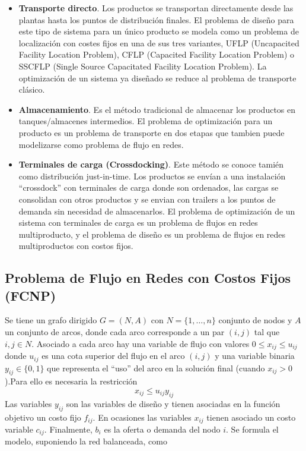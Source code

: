 \begin{itemize}
    \item \textbf{Transporte directo}. Los productos se transportan directamente desde las plantas hasta los puntos de
    distribución finales. El problema de diseño para este tipo de sistema para un único producto se modela como un problema
    de localización con costes fijos en una de sus tres variantes, UFLP (Uncapacited Facility Location Problem), CFLP
    (Capacited Facility Location Problem) o SSCFLP (Single Source Capacitated Facility Location Problem). La optimización de
    un sistema ya diseñado se reduce al problema de transporte clásico.
    \item \textbf{Almacenamiento}. Es el método tradicional de almacenar los productos en tanques/almacenes intermedios. El problema de
    optimización para un producto es un problema de transporte en dos etapas que tambien puede modelizarse como problema de
    flujo en redes.
    \item \textbf{Terminales de carga (Crossdocking)}. Este método se conoce tamién como distribución just-in-time. Los
    productos se envían a una instalación ``crossdock'' con terminales de carga donde son ordenados, las cargas se consolidan
    con otros productos y se envian con trailers a los puntos de demanda sin necesidad de almacenarlos. El problema de
    optimización de un sistema con terminales de carga es un problema de flujos en redes multiproducto, y el problema de diseño
    es un problema de flujos en redes multiproductos con costos fijos.
\end{itemize}

\subsection{Problema de Flujo en Redes con Costos Fijos (FCNP)}

Se tiene un grafo dirigido $G=(N,A)$ con $N=\{1,\dots,n\}$ conjunto de nodos y $A$ un conjunto de arcos, donde cada arco
corresponde a un par $(i,j)$ tal que $i,j\in N$. Asociado a cada arco hay una variable de flujo con valores 
$0\leq x_{ij}\leq u_{ij}$ donde $u_{ij}$ es una cota superior del flujo en el arco $(i,j)$ y una variable binaria 
$y_{ij}\in\{0,1\}$ que representa el ``uso'' del arco en la solución final (cuando $x_{ij}>0$).Para ello es necesaria la
restricción
\[
    x_{ij}\leq u_{ij}y_{ij}
\]
Las variables $y_{ij}$ son las variables de diseño y tienen asociadas en la función objetivo un costo fijo $f_{ij}$. En 
ocasiones las variables $x_{ij}$ tienen asociado un costo variable $c_{ij}$. Finalmente, $b_i$ es la oferta o demanda del
nodo $i$. Se formula el modelo, suponiendo la red balanceada, como

